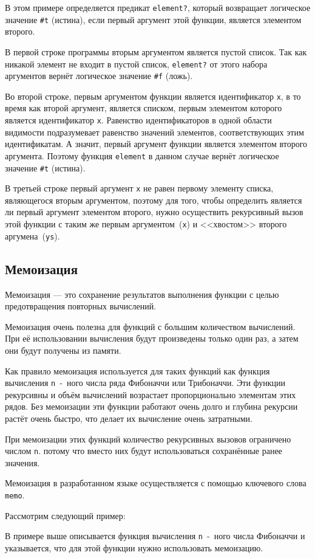     В этом примере определяется предикат \verb,element?,, который возвращает логическое значение \verb,#t, (истина), если первый аргумент этой функции, является элементом второго.

    В первой строке программы вторым аргументом является пустой список.
    Так как никакой элемент не входит в пустой список, \verb,element?, от этого набора аргументов вернёт логическое значение \verb,#f, (ложь).

    Во второй строке, первым аргументом функции является идентификатор \verb,x,, в то время как второй аргумент, является списком, первым элементом которого является идентификатор \verb,x,.
    Равенство идентификаторов в одной области видимости подразумевает равенство значений элементов, соответствующих этим идентификатам.
    А значит, первый аргумент функции является элементом второго аргумента.
    Поэтому функция \verb,element, в данном случае вернёт логическое значение \verb,#t, (истина).

    В третьей строке первый аргумент \verb$x$ не равен первому элементу списка, являющегося вторым аргументом, поэтому для того, чтобы определить является ли первый аргумент элементом второго, нужно осуществить рекурсивный вызов этой функции с таким же первым аргументом~(\verb,x,) и <<хвостом>> второго аргумена~(\verb,ys,).

    \subsection{Мемоизация}

    Мемоизация --- это сохранение результатов выполнения функции с целью предотвращения повторных вычислений.

    Мемоизация очень полезна для функций с большим количеством вычислений.
    При её использовании вычисления будут произведены только один раз, а затем они будут получены из памяти.

    Как правило мемоизация используется для таких функций как функция вычисления \verb,n,~-~ного числа ряда Фибоначчи или Трибоначчи.
    Эти функции рекурсивны и объём вычислений возрастает пропорционально элементам этих рядов.
    Без мемоизации эти функции работают очень долго и глубина рекурсии растёт очень быстро, что делает их вычисление очень затратными.

    При мемоизации этих функций количество рекурсивных вызовов ограничено числом \verb,n,. потому что вместо них будут использоваться сохранённые ранее значения.

    Мемоизация в разработанном языке осуществляется с помощью ключевого слова \verb,memo,.

    Рассмотрим следующий пример:

    

    В примере выше описывается функция вычисления \verb,n,~-~ного числа Фибоначчи и указывается, что для этой функции нужно использовать мемоизацию.
